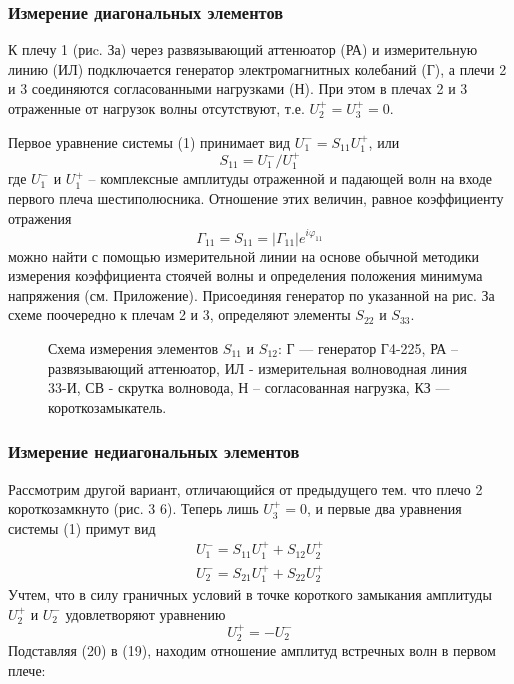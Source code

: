 \subsubsection{Измерение диагональных элементов}
К плечу 1 (риc. За) через развязывающий аттенюатор (РА) и измерительную линию (ИЛ) подключается генератор электромагнитных  колебаний (Г), а плечи 2 и 3 соединяются согласованными нагрузками (Н). 
При этом в плечах 2 и 3 отраженные от нагрузок волны отсутствуют, т.е. $U _ { 2 } ^ { + } = U _ { 3 } ^ { + } = 0$.


Первое уравнение системы (1) принимает вид $U_1^-=S_{11}U_1^+$, или
\begin{equation}
	S _ { 11 } = U _ { 1 } ^ { - } / U _ { 1 } ^ { + }
\end{equation}
где $U _ { 1 } ^ { - }$ и $U _ { 1 } ^ { + }$ -- комплексные амплитуды отраженной и падающей волн на входе первого плеча шестиполюсника. Отношение этих величин, равное коэффициенту отражения 
\begin{equation}
	\Gamma _ { 11 } = S _ { 11 } = \left| \Gamma _ { 11 } \right| e ^ { i \varphi _ { 11 } }
\end{equation}
можно найти с помощью измерительной линии на основе обычной методики измерения коэффициента стоячей волны и определения положения минимума напряжения (см. Приложение). 
Присоединяя генератор по указанной на рис. За схеме поочередно к плечам 2 и 3, определяют элементы $S_{22}$ и $S_{33}$.

\begin{figure}[h!]
	\centering
	\caption{Схема измерения элементов $S_{11}$ и $S_{12}$:  Г --- генератор Г4-225, РА  -- развязывающий аттенюатор, ИЛ - измерительная волноводная линия 33-И, СВ - скрутка волновода,  Н -- согласованная нагрузка, КЗ --- короткозамыкатель.}
	\label{fig:fig3}
\end{figure}



\subsubsection{Измерение недиагональных элементов}

Рассмотрим другой вариант, отличающийся от предыдущего тем. что плечо 2 короткозамкнуто (рис. 3 6). Теперь лишь $U_3^+=0$, и первые два уравнения системы (1) примут вид
\begin{equation}
	\begin{array} { l } { U _ { 1 } ^ { - } = S _ { 11 } U _ { 1 } ^ { + } + S _ { 12 } U _ { 2 } ^ { + } } \\ { U _ { 2 } ^ { - } = S _ { 21 } U _ { 1 } ^ { + } + S _ { 22 } U _ { 2 } ^ { + } } \end{array}
\end{equation}
Учтем, что в силу граничных условий в точке короткого замыкания амплитуды $U_2^+$ и $U_2^-$ удовлетворяют уравнению
\begin{equation}
	U _ { 2 } ^ { + } = - U _ { 2 } ^ { - }
\end{equation}
Подставляя (20) в (19), находим отношение амплитуд встречных волн в первом плече:

